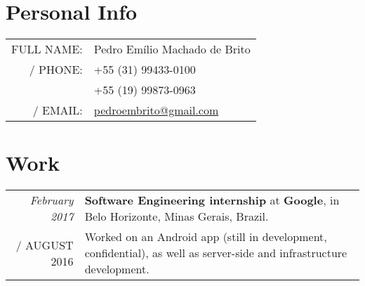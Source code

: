 \documentclass[a4paper,10pt]{article}
\makeatletter
\def\fakesc#1{%
  \begingroup%
  \xdef\fake@name{\csname\curr@fontshape/\f@size\endcsname}%
  \fontsize{\fontdimen8\fake@name}{\baselineskip}\selectfont%
  \uppercase{#1}%
  \endgroup%
}
\renewcommand{\textsc}{\fakesc}
\makeatother
\begin{document}
\pagestyle{empty} %

\par{\bigskip\par}

\section{Personal Info}

\begin{tabularx}{\textwidth}{ rl}
  \textsc{Full name:} & Pedro Emílio Machado de Brito \\
  \textsc{Phone:} & +55 (31) 99433-0100 \\
 & +55 (19) 99873-0963 \\
  \textsc{Email:} & \href{mailto:pedroembrito@gmail.com}{pedroembrito@gmail.com}\\
\end{tabularx}




\section{Work}

\begin{tabularx}{\textwidth}{r|X}	

  \emph{February 2017} & \textbf{Software Engineering internship} at \textbf{Google}, in Belo Horizonte, Minas Gerais, Brazil.\\
  \textsc{August 2016} & \footnotesize{Worked on an Android app (still in development, confidential), as well as server-side and infrastructure development}.\\

\end{tabularx}
\end{document}

